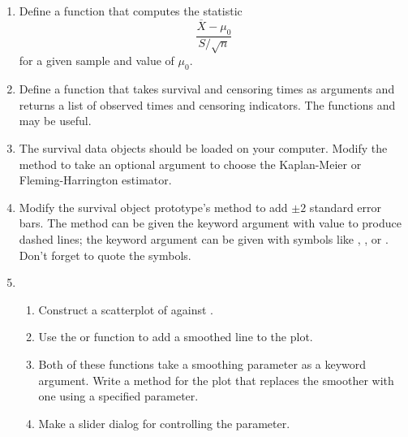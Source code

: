 \newpage
{}
\begin{enumerate}
\item
Define a function that computes the statistic
\begin{displaymath}
\frac{\overline{X}-\mu_{0}}{S/\sqrt{n}}
\end{displaymath}
for a given sample and value of $\mu_{0}$.

\item
Define a function that takes survival and censoring times as arguments
and returns a list of observed times and censoring indicators. The
functions  and  may be useful.

\item
The survival data objects should be loaded on your computer. Modify
the  method to take an optional argument to choose the
Kaplan-Meier or Fleming-Harrington estimator.

\item
Modify the survival object prototype's  method to add
$\pm2$ standard error bars. The  method can be
given the keyword argument  with value  to
produce dashed lines; the keyword argument  can be given
with symbols like , , or .  Don't
forget to quote the symbols.

\item
\begin{enumerate}
\item
Construct a scatterplot of  against
.
\item
Use the  or  function to add a
smoothed line to the plot.
\item
Both of these functions take a smoothing parameter as a keyword
argument.  Write a method for the plot that replaces the smoother with
one using a specified parameter.
\item
Make a slider dialog for controlling the parameter.
\end{enumerate}
\end{enumerate}

